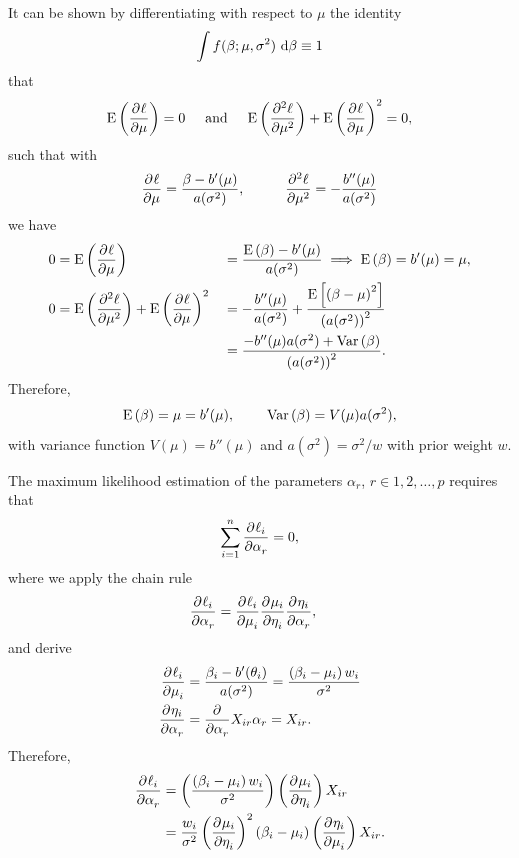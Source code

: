 It can be shown by differentiating with respect to $\mu$ the identity
$$\int f(\beta; \mu, \sigma^2) \d{\beta} \equiv 1$$
that
\begin{align*}
  \Ex\left( \parder{\ell}{\mu} \right) = 0 \hspace{5mm} \text{and} \hspace{5mm}
  \Ex\left( \parder[2]{\ell}{\mu} \right) + \Ex\left( \parder{\ell}{\mu} \right)^2 = 0,
\end{align*}
such that with
\begin{align*}
  \parder{\ell}{\mu} = \frac{\beta - b'(\mu)}{a(\sigma^2)}, \hspace{10mm} 
  \parder[2]{\ell}{\mu} = -\frac{b''(\mu)}{a(\sigma^2)}
\end{align*}
we have
\begin{align*}
  0 &= \Ex\left( \parder{\ell}{\mu} \right) &&= \frac{\Ex\left(\beta\right) - b'(\mu)}{a(\sigma^2)} \implies \Ex\left( \beta \right) = b'(\mu) = \mu, \\
  0 &= \Ex\left( \parder[2]{\ell}{\mu} \right) + \Ex\left( \parder{\ell}{\mu} \right)^2 &&= -\frac{b''(\mu)}{a(\sigma^2)} + \frac{\Ex\left[\left(\beta - \mu \right)^2\right]}{\left(a(\sigma^2)\right)^2} \\
  & &&= \frac{-b''(\mu) a(\sigma^2) + \var\left(\beta\right)}{\left(a(\sigma^2)\right)^2}.
\end{align*}
Therefore,
$$\Ex\left( \beta \right) = \mu = b'(\mu), \hspace{8mm} \var\left(\beta\right) = V(\mu) a(\sigma^2),$$
with variance function $V(\mu) = b''(\mu)$ and $a(\sigma^2) = \sigma^2 / w$ with prior weight $w$.

The maximum likelihood estimation of the parameters $\alpha_r$, $r \in 1,2,\ldots, p$ requires that
$$\sum_{i=1}^n \parder{\ell_i}{\alpha_r} = 0,$$
where we apply the chain rule
\begin{align*}
  \parder{\ell_i}{\alpha_r} &= \parder{\ell_i}{\mu_i} \parder{\mu_i}{\eta_i} \parder{\eta_i}{\alpha_r},
\end{align*}
and derive
\begin{align*}
  \parder{\ell_i}{\mu_i} &=  \frac{\beta_i - b'(\theta_i)}{a(\sigma^2)} = \frac{\left(\beta_i - \mu_i\right)w_i}{\sigma^2} \\
  \parder{\eta_i}{\alpha_r} &= \parder{}{\alpha_r} X_{ir} \alpha_r = X_{ir}.
\end{align*}
Therefore,
\begin{align*}
  \parder{\ell_i}{\alpha_r} &= \left( \frac{\left(\beta_i - \mu_i\right)w_i}{\sigma^2} \right) \left( \parder{\mu_i}{\eta_i} \right) X_{ir} \\
  &= \frac{w_i}{\sigma^2} \left( \parder{\mu_i}{\eta_i} \right)^2 \left(\beta_i - \mu_i\right) \left( \parder{\eta_i}{\mu_i} \right) X_{ir}.
\end{align*}

